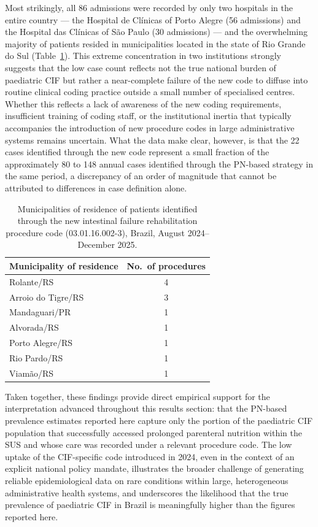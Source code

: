 \documentclass[pdflatex,sn-mathphys-num]{sn-jnl}
\theoremstyle{thmstyleone}%
\theoremstyle{thmstyletwo}%
\theoremstyle{thmstylethree}%
\begin{document}
Most strikingly, all 86 admissions were recorded by only two hospitals in the entire country --- the Hospital de Cl\'{i}nicas of Porto Alegre (56 admissions) and the Hospital das Cl\'{i}nicas of S\~{a}o Paulo (30 admissions) --- and the overwhelming majority of patients resided in municipalities located in the state of Rio Grande do Sul (Table~\ref{tab:municipios}). This extreme concentration in two institutions strongly suggests that the low case count reflects not the true national burden of paediatric CIF but rather a near-complete failure of the new code to diffuse into routine clinical coding practice outside a small number of specialised centres. Whether this reflects a lack of awareness of the new coding requirements, insufficient training of coding staff, or the institutional inertia that typically accompanies the introduction of new procedure codes in large administrative systems remains uncertain. What the data make clear, however, is that the 22 cases identified through the new code represent a small fraction of the approximately 80 to 148 annual cases identified through the PN-based strategy in the same period, a discrepancy of an order of magnitude that cannot be attributed to differences in case definition alone.

\begin{table}[ht]
\centering
\caption{Municipalities of residence of patients identified through the new intestinal failure rehabilitation procedure code (03.01.16.002-3), Brazil, August 2024--December 2025.}
\label{tab:municipios}
\begin{tabular}{lc}
\hline
Municipality of residence & No.\ of procedures \\
\hline
Rolante/RS & 4 \\
Arroio do Tigre/RS & 3 \\
Mandaguari/PR & 1 \\
Alvorada/RS & 1 \\
Porto Alegre/RS & 1 \\
Rio Pardo/RS & 1 \\
Viam\~{a}o/RS & 1 \\
\hline
\end{tabular}
\end{table}

Taken together, these findings provide direct empirical support for the interpretation advanced throughout this results section: that the PN-based prevalence estimates reported here capture only the portion of the paediatric CIF population that successfully accessed prolonged parenteral nutrition within the SUS and whose care was recorded under a relevant procedure code. The low uptake of the CIF-specific code introduced in 2024, even in the context of an explicit national policy mandate, illustrates the broader challenge of generating reliable epidemiological data on rare conditions within large, heterogeneous administrative health systems, and underscores the likelihood that the true prevalence of paediatric CIF in Brazil is meaningfully higher than the figures reported here.
\end{document}
